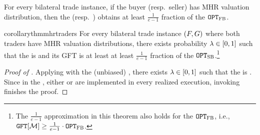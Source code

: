 \begin{theorem}
\label{thm:BO SO GFT:mhr traders}
    For every bilateral trade instance, if the buyer (resp.\ seller) has MHR valuation distribution, then the {\SellerOffer} (resp.\ {\BuyerOffer}) obtains at least $\frac{1}{e - 1}$ fraction of the {\FirstBest} $\texttt{OPT}_{\textsc{FB}}$.
\end{theorem}
\begin{restatable}{corollary}{thmmhrtraders}
\label{thm:improved GFT:mhr traders}
For every bilateral trade instance $(F,G)$ where both traders have MHR valuation distributions, there exists probability $\lambda\in[0, 1]$ such that the {\BiasedRandomOffer} is {\ksfair} and its GFT is at least at least $\frac{1}{e-1}$ fraction of the {\SecondBest} $\texttt{OPT}_{\textsc{SB}}$.\footnote{The $\frac{1}{e - 1}$ approximation in this theorem also holds for the {\FirstBest} $\texttt{OPT}_{\textsc{FB}}$, i.e., $\GFT{\mech} \geq \frac{1}{e - 1}\cdot \OPTFB$.}
\end{restatable}
\begin{proof}[Proof of ]
    Applying  with the (unbiased) {\RandomOffer}, there exists $\lambda\in[0, 1]$ such that the {\BiasedRandomOffer} is {\ksfair}. Since in the {\BiasedRandomOffer}, either {\BuyerOffer} or {\SellerOffer} are implemented in every realized execution, invoking  finishes the proof.
\end{proof}